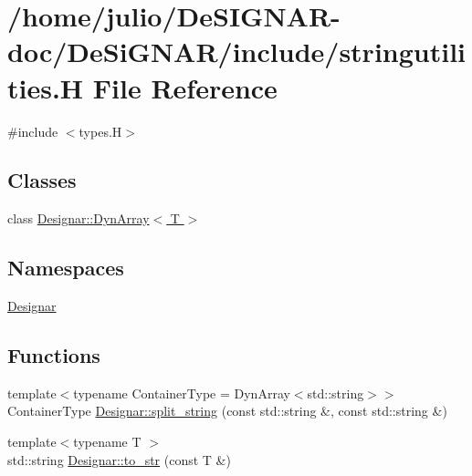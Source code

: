 \hypertarget{stringutilities_8_h}{}\section{/home/julio/\+De\+S\+I\+G\+N\+A\+R-\/doc/\+De\+Si\+G\+N\+A\+R/include/stringutilities.H File Reference}
\label{stringutilities_8_h}
{\ttfamily \#include $<$types.\+H$>$}\newline
\subsection*{Classes}
\begin{DoxyCompactItemize}
\item 
class \hyperlink{class_designar_1_1_dyn_array}{Designar\+::\+Dyn\+Array$<$ T $>$}
\end{DoxyCompactItemize}
\subsection*{Namespaces}
\begin{DoxyCompactItemize}
\item 
 \hyperlink{namespace_designar}{Designar}
\end{DoxyCompactItemize}
\subsection*{Functions}
\begin{DoxyCompactItemize}
\item 
{\footnotesize template$<$typename Container\+Type  = Dyn\+Array$<$std\+::string$>$$>$ }\\Container\+Type \hyperlink{namespace_designar_aa31b131e36bd60bc3512a13ed11c8501}{Designar\+::split\+\_\+string} (const std\+::string \&, const std\+::string \&)
\item 
{\footnotesize template$<$typename T $>$ }\\std\+::string \hyperlink{namespace_designar_a3a65054e43d88058112c15679b43c4e4}{Designar\+::to\+\_\+str} (const T \&)
\end{DoxyCompactItemize}
